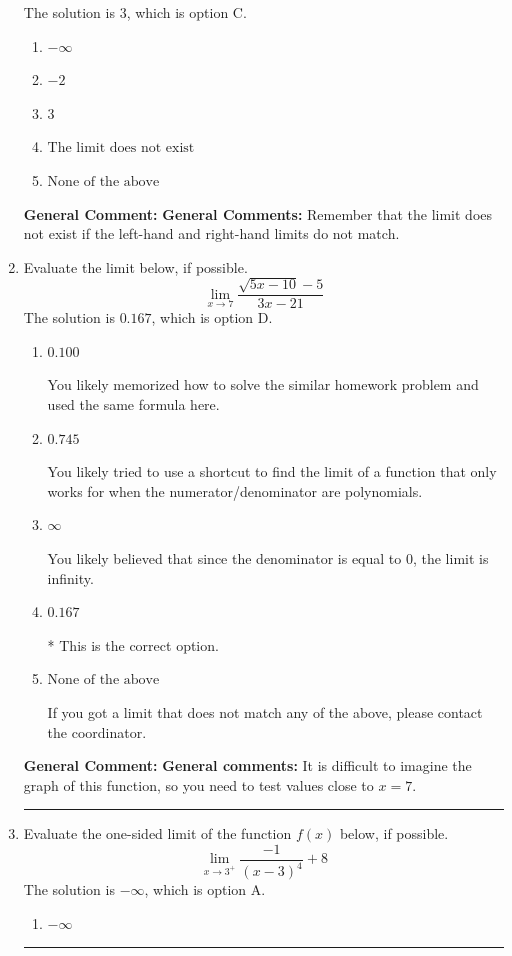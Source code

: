 \documentclass{extbook}[14pt]
\newcommand{\litem}[1]{\item #1

\rule{\textwidth}{0.4pt}}
\begin{document}
\begin{enumerate}
{The solution is \( 3 \), which is option C.\begin{enumerate}[label=\Alph*.]
\item \( -\infty \)


\item \( -2 \)


\item \( 3 \)


\item \( \text{The limit does not exist} \)


\item \( \text{None of the above} \)


\end{enumerate}

\textbf{General Comment:} \textbf{General Comments:} Remember that the limit does not exist if the left-hand and right-hand limits do not match.
}
\litem{
Evaluate the limit below, if possible.
\[ \lim_{x \rightarrow 7} \frac{\sqrt{5x - 10} - 5}{3x - 21} \]The solution is \( 0.167 \), which is option D.\begin{enumerate}[label=\Alph*.]
\item \( 0.100 \)

You likely memorized how to solve the similar homework problem and used the same formula here.
\item \( 0.745 \)

You likely tried to use a shortcut to find the limit of a function that only works for when the numerator/denominator are polynomials.
\item \( \infty \)

You likely believed that since the denominator is equal to 0, the limit is infinity.
\item \( 0.167 \)

* This is the correct option.
\item \( \text{None of the above} \)

If you got a limit that does not match any of the above, please contact the coordinator.
\end{enumerate}

\textbf{General Comment:} \textbf{General comments:} It is difficult to imagine the graph of this function, so you need to test values close to $x = 7$.
}
\litem{
Evaluate the one-sided limit of the function $f(x)$ below, if possible.
\[ \lim_{x \rightarrow 3^+} \frac{-1}{(x-3)^4}+8 \]The solution is \( -\infty \), which is option A.\begin{enumerate}[label=\Alph*.]
\item \( -\infty \)



\end{enumerate}}
\end{enumerate}
\end{document}
